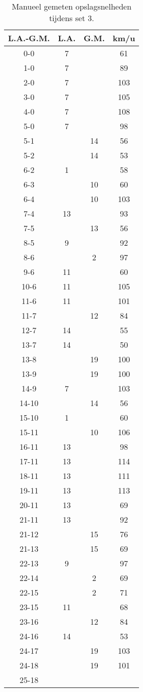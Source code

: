 \begin{table}[h!]
  \centering
  \scriptsize
  \begin{tabular}{|c|c|c|c|} \hline
    L.A.-G.M. & L.A. & G.M. & km/u \\ \hline
    0-0 & 7 & & 61 \\
    1-0 & 7 & & 89 \\
    2-0 & 7 & & 103 \\
    3-0 & 7 & & 105 \\
    4-0 & 7 & & 108 \\
    5-0 & 7 & & 98 \\
    5-1 & & 14 & 56 \\
    5-2 & & 14 & 53 \\
    6-2 & 1 & & 58 \\
    6-3 & & 10 & 60 \\
    6-4 & & 10 & 103 \\
    7-4 & 13 & & 93 \\
    7-5 &  & 13 & 56 \\
    8-5 & 9 & & 92 \\
    8-6 &  & 2 & 97 \\
    9-6 & 11 & & 60 \\
    10-6 & 11 & & 105 \\
    11-6 & 11 & & 101 \\
    11-7 & & 12 & 84 \\
    12-7 & 14 & & 55 \\
    13-7 & 14 & & 50 \\
    13-8 & & 19 & 100 \\
    13-9 & & 19 & 100 \\
    14-9 & 7 & & 103 \\
    14-10 & & 14 & 56 \\
    15-10 & 1 & & 60 \\
    15-11 & & 10 & 106 \\
    16-11 & 13 & & 98 \\
    17-11 & 13 & & 114 \\
    18-11 & 13 & & 111 \\
    19-11 & 13 & & 113 \\
    20-11 & 13 & & 69 \\
    21-11 & 13 & & 92 \\
    21-12 & & 15 & 76 \\
    21-13 & & 15 & 69 \\
    22-13 & 9 & & 97 \\
    22-14 & & 2 & 69 \\
    22-15 & & 2 & 71 \\
    23-15 & 11 & & 68 \\
    23-16 & & 12 & 84 \\
    24-16 & 14 & & 53 \\
    24-17 & & 19 & 103 \\
    24-18 & & 19 & 101 \\
    25-18 & & & \\ \hline
  \end{tabular}
  \caption[Manueel gemeten opslagsnelheden tijdens set 3]{\label{tab:PL1ServeMan3}Manueel gemeten opslagsnelheden tijdens set 3.}
\end{table}
